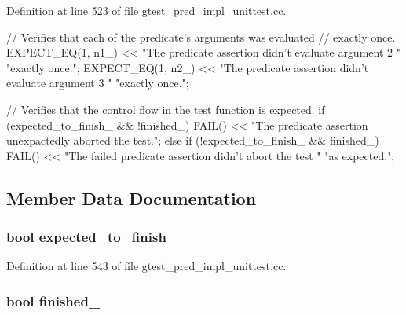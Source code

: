 \-Definition at line 523 of file gtest\-\_\-pred\-\_\-impl\-\_\-unittest.\-cc.


\begin{DoxyCode}
                          {
    // Verifies that each of the predicate's arguments was evaluated
    // exactly once.
    EXPECT_EQ(1, n1_) <<
        "The predicate assertion didn't evaluate argument 2 "
        "exactly once.";
    EXPECT_EQ(1, n2_) <<
        "The predicate assertion didn't evaluate argument 3 "
        "exactly once.";

    // Verifies that the control flow in the test function is expected.
    if (expected_to_finish_ && !finished_) {
      FAIL() << "The predicate assertion unexpactedly aborted the test.";
    } else if (!expected_to_finish_ && finished_) {
      FAIL() << "The failed predicate assertion didn't abort the test "
                "as expected.";
    }
  }
\end{DoxyCode}


\subsection{\-Member \-Data \-Documentation}
\hypertarget{classPredicate2Test_af30fae6aaebdd5a6cb055c420573754d}{
\subsubsection[{expected\-\_\-to\-\_\-finish\-\_\-}]{\setlength{\rightskip}{0pt plus 5cm}bool {\bf expected\-\_\-to\-\_\-finish\-\_\-}}}\label{dc/dc4/classPredicate2Test_af30fae6aaebdd5a6cb055c420573754d}


\-Definition at line 543 of file gtest\-\_\-pred\-\_\-impl\-\_\-unittest.\-cc.

\hypertarget{classPredicate2Test_a9189d6cfedf2ace6f5f6aa152ba38f83}{
\subsubsection[{finished\-\_\-}]{\setlength{\rightskip}{0pt plus 5cm}bool {\bf finished\-\_\-}}}\label{dc/dc4/classPredicate2Test_a9189d6cfedf2ace6f5f6aa152ba38f83}


